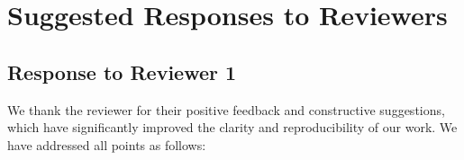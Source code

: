 \documentclass[11pt, a4paper]{article}
\begin{document}
	\newpage
	
	\section{Suggested Responses to Reviewers}

	

	\subsection*{Response to Reviewer 1}
	
	We thank the reviewer for their positive feedback and constructive suggestions, which have significantly improved the clarity and reproducibility of our work. We have addressed all points as follows:
	
\end{document}
